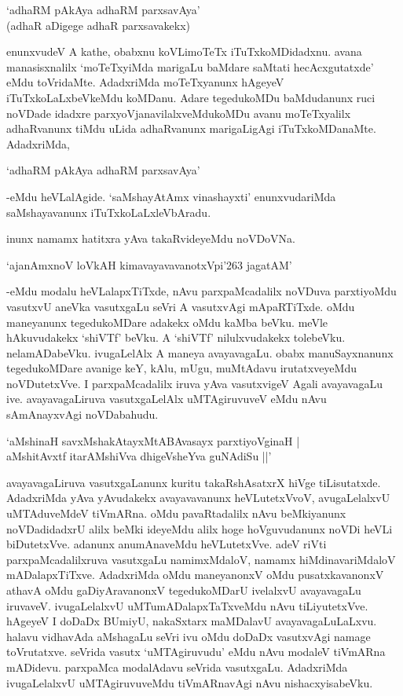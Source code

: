 \begin{shloka}
`adhaRM pAkAya adhaRM parxsavAya'\\
(adhaR aDigege adhaR parxsavakekx)
\end{shloka}

enunxvudeV A kathe, obabxnu koVLimoTeTx iTuTxkoMDidadxnu. avana manasisxnalilx `moTeTxyiMda marigaLu baMdare saMtati hecAcxgutatxde' eMdu toVridaMte. AdadxriMda moTeTxyanunx hAgeyeV iTuTxkoLaLxbeVkeMdu koMDanu. Adare tegedukoMDu baMdudanunx ruci noVDade idadxre parxyoVjanavilalxveMdukoMDu avanu moTeTxyalilx adhaRvanunx tiMdu uLida adhaRvanunx marigaLigAgi iTuTxkoMDanaMte. AdadxriMda,

\begin{shloka}
`adhaRM pAkAya adhaRM parxsavAya'
\end{shloka}

-eMdu heVLalAgide. `saMshayAtAmx vinashayxti' enunxvudariMda saMshayavanunx iTuTxkoLaLxleVbAradu.

inunx namamx hatitxra yAva takaRvideyeMdu noVDoVNa.

\begin{shloka}
`ajanAmxnoV loVkAH kimavayavavanotxVpi\char'263 jagatAM'
\end{shloka}

-eMdu modalu heVLalapxTiTxde, nAvu parxpaMcadalilx noVDuva parxtiyoMdu vasutxvU aneVka vasutxgaLu seVri A vasutxvAgi mApaRTiTxde. oMdu maneyanunx tegedukoMDare adakekx oMdu kaMba beVku. meVle hAkuvudakekx `shiVTf' beVku. A `shiVTf' nilulxvudakekx tolebeVku. nelamADabeVku. ivugaLelAlx A maneya avayavagaLu. obabx manuSayxnanunx tegedukoMDare avanige keY, kAlu, mUgu, muMtAdavu irutatxveyeMdu noVDutetxVve. I parxpaMcadalilx iruva yAva vasutxvigeV Agali avayavagaLu ive. avayavagaLiruva vasutxgaLelAlx uMTAgiruvuveV eMdu nAvu sAmAnayxvAgi noVDabahudu.

\begin{shloka}
`aMshinaH savxMshakAtayxMtABAvasayx parxtiyoVginaH |\\
aMshitAvxtf itarAMshiVva dhigeVsheYva guNAdiSu ||'
\end{shloka}

avayavagaLiruva vasutxgaLanunx kuritu takaRshAsatxrX hiVge tiLisutatxde. AdadxriMda yAva yAvudakekx avayavavanunx heVLutetxVvoV, avugaLelalxvU uMTAduveMdeV tiVmARna. oMdu pavaRtadalilx nAvu beMkiyanunx noVDadidadxrU alilx beMki ideyeMdu alilx hoge hoVguvudanunx noVDi heVLi biDutetxVve. adanunx anumAnaveMdu heVLutetxVve. adeV riVti parxpaMcadalilxruva vasutxgaLu namimxMdaloV, namamx hiMdinavariMdaloV mADalapxTiTxve. AdadxriMda oMdu maneyanonxV oMdu pusatxkavanonxV athavA oMdu gaDiyAravanonxV tegedukoMDarU ivelalxvU avayavagaLu iruvaveV. ivugaLelalxvU uMTumADalapxTaTxveMdu nAvu tiLiyutetxVve. hAgeyeV I doDaDx BUmiyU, nakaSxtarx maMDalavU avayavagaLuLaLxvu. halavu vidhavAda aMshagaLu seVri ivu oMdu doDaDx vasutxvAgi namage toVrutatxve. seVrida vasutx `uMTAgiruvudu' eMdu nAvu modaleV tiVmARna mADidevu. parxpaMca modalAdavu seVrida vasutxgaLu. AdadxriMda ivugaLelalxvU uMTAgiruvuveMdu tiVmARnavAgi nAvu nishacxyisabeVku.

